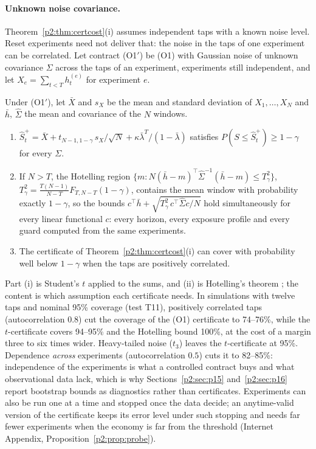\paragraph{Unknown noise covariance.} Theorem~\ref{p2:thm:certcost}(i) assumes independent taps with a known noise level. Reset experiments need not deliver that: the noise in the taps of one experiment can be correlated. Let contract (O1$'$) be (O1) with Gaussian noise of unknown covariance $\Sigma$ across the taps of an experiment, experiments still independent, and let $X_e=\sum_{t<T}h^{(e)}_t$ for experiment $e$.

\begin{proposition}\label{p2:prop:hotelling}
Under (O1$'$), let $\bar X$ and $s_X$ be the mean and standard deviation of $X_1,\ldots,X_N$ and $\bar h$, $\hat\Sigma$ the mean and covariance of the $N$ windows.
\begin{enumerate}[label=(\roman*)]
\item $\hat S^+_t=\bar X+t_{N-1,1-\gamma}\,s_X/\sqrt N+\kappa\bar\lambda^T/(1-\bar\lambda)$ satisfies $P(S\le\hat S^+_t)\ge1-\gamma$ for every $\Sigma$.
\item If $N>T$, the Hotelling region $\{m:N(\bar h-m)^\top\hat\Sigma^{-1}(\bar h-m)\le T^2_\gamma\}$, $T^2_\gamma=\frac{T(N-1)}{N-T}F_{T,N-T}(1-\gamma)$, contains the mean window with probability exactly $1-\gamma$, so the bounds $c^\top\bar h+\sqrt{T^2_\gamma\,c^\top\hat\Sigma c/N}$ hold simultaneously for every linear functional $c$: every horizon, every exposure profile and every guard computed from the same experiments.
\item The certificate of Theorem~\ref{p2:thm:certcost}(i) can cover with probability well below $1-\gamma$ when the taps are positively correlated.
\end{enumerate}
\end{proposition}

Part (i) is Student's $t$ applied to the sums, and (ii) is Hotelling's theorem \citep{p2:hotelling1931}; the content is which assumption each certificate needs. In simulations with twelve taps and nominal 95\% coverage (test T11), positively correlated taps (autocorrelation $0.8$) cut the coverage of the (O1) certificate to 74--76\%, while the $t$-certificate covers 94--95\% and the Hotelling bound 100\%, at the cost of a margin three to six times wider. Heavy-tailed noise ($t_3$) leaves the $t$-certificate at 95\%. Dependence \emph{across} experiments (autocorrelation $0.5$) cuts it to 82--85\%: independence of the experiments is what a controlled contract buys and what observational data lack, which is why Sections~\ref{p2:sec:p15} and~\ref{p2:sec:p16} report bootstrap bounds as diagnostics rather than certificates. Experiments can also be run one at a time and stopped once the data decide; an anytime-valid version of the certificate keeps its error level under such stopping and needs far fewer experiments when the economy is far from the threshold (Internet Appendix, Proposition~\ref{p2:prop:probe}).
